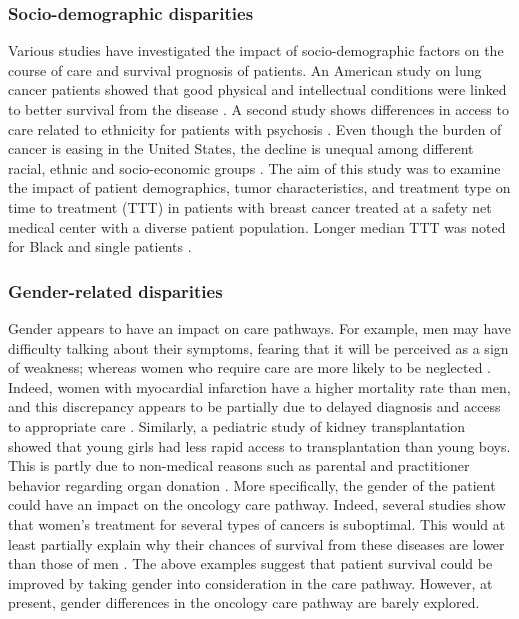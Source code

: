 \subsubsection{Socio-demographic disparities}

Various studies have investigated the impact of socio-demographic factors on the
course of care and survival prognosis of patients. An American study on lung
cancer patients showed that good physical and intellectual conditions were
linked to better survival from the disease
\cite{pierzynski_socio-demographic_2018}. A second study shows differences in
access to care related to ethnicity for patients with psychosis
\cite{anderson_meta-analysis_2014}. Even though the burden of cancer is easing
in the United States, the decline is unequal among different racial, ethnic and
socio-economic groups \cite{viswanath_science_2005}. The aim of this study was
to examine the impact of patient demographics, tumor characteristics, and
treatment type on time to treatment (TTT) in patients with breast cancer treated
at a safety net medical center with a diverse patient population. Longer median
TTT was noted for Black and single patients \cite{khanna_impact_2017}.

\subsubsection{Gender-related disparities}

Gender appears to have an impact on care pathways. For example, men may have
difficulty talking about their symptoms, fearing that it will be perceived as a
sign of weakness; whereas women who require care are more likely to be neglected
\cite{ferrari_gender_2018}. Indeed, women with myocardial infarction have a
higher mortality rate than men, and this discrepancy appears to be partially due
to delayed diagnosis and access to appropriate care
\cite{bugiardini_delayed_2017}. Similarly, a pediatric study of kidney
transplantation showed that young girls had less rapid access to transplantation
than young boys. This is partly due to non-medical reasons such as parental and
practitioner behavior regarding organ donation \cite{hogan_j_gender_2016}. More
specifically, the gender of the patient could have an impact on the oncology
care pathway. Indeed, several studies show that women's treatment for several
types of cancers is suboptimal. This would at least partially explain why their
chances of survival from these diseases are lower than those of men
\cite{park_a_undertreatment_2019,carter_paulson_e_gender_2009,rose_sex_2016}.
The above examples suggest that patient survival could be improved by taking
gender into consideration in the care pathway. However, at present, gender
differences in the oncology care pathway are barely explored.


